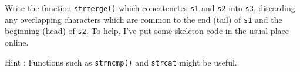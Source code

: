 
\toohard 

\begin{exercise}
Write the function \verb^strmerge()^ which concatenetes \verb^s1^ and \verb^s2^ into \verb^s3^,
discarding any overlapping characters which are common to the end (tail) of \verb^s1^ and the 
beginning (head) of \verb^s2^.
To help, I've put some skeleton code in the usual place online.

Hint : Functions such as \verb^strncmp()^ and \verb^strcat^ might be useful.
\end{exercise}
